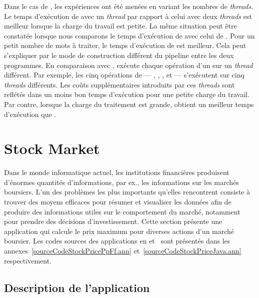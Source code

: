 Dans le cas de , les exp\'eriences ont \'et\'e men\'ees en variant les nombres de \emph{threads}. Le temps d'ex\'ecution de  avec un \emph{thread} par rapport \`a celui avec deux \emph{threads} est meilleur lorsque la charge du travail est petite. La m\^eme situation peut \^etre constat\'ee lorsque nous comparons le temps d'ex\'ecution de  avec celui de . Pour un petit nombre de mots \`a traiter, le temps d'ex\'ecution de  est meilleur. Cela peut s'expliquer par le mode de construction diff\'erent du pipeline entre les deux programmes. En comparaison avec ,  ex\'ecute chaque op\'eration d'un  sur un \emph{thread} diff\'erent. Par exemple, les cinq op\'erations de  --- , , ,  et  --- s'ex\'ecutent sur cinq \emph{threads} diff\'erents. Les co\^uts suppl\'ementaires introduits par ces \emph{threads} sont refl\'et\'es dans un moins bon temps d'ex\'ecution pour une petite charge du travail. Par contre, lorsque la charge du traitement est grande,  obtient un meilleur temps d'ex\'ecution que .



\section{Stock Market}
\label{stockprice.sect}


Dans le monde informatique actuel, les institutions financi\`eres produisent d'\'enormes quantit\'es d'informations, par ex., les informations sur les march\'es boursiers. L'un des probl\`emes les plus importants qu'elles rencontrent consiste \`a trouver des moyens efficaces pour r\'esumer et visualiser les donn\'ees afin de produire des informations utiles sur le comportement du march\'e, notamment pour prendre des d\'ecisions d'investissement. Cette section pr\'esente une application qui calcule le prix maximum pour diverses actions d'un marché boursier. Les codes sources des applications  en  et~ sont pr\'esent\'es dans les annexes~\ref{sourceCodeStockPricePpFf.ann} et~\ref{sourceCodeStockPriceJava.ann} respectivement. 

\subsection{Description de l'application}


